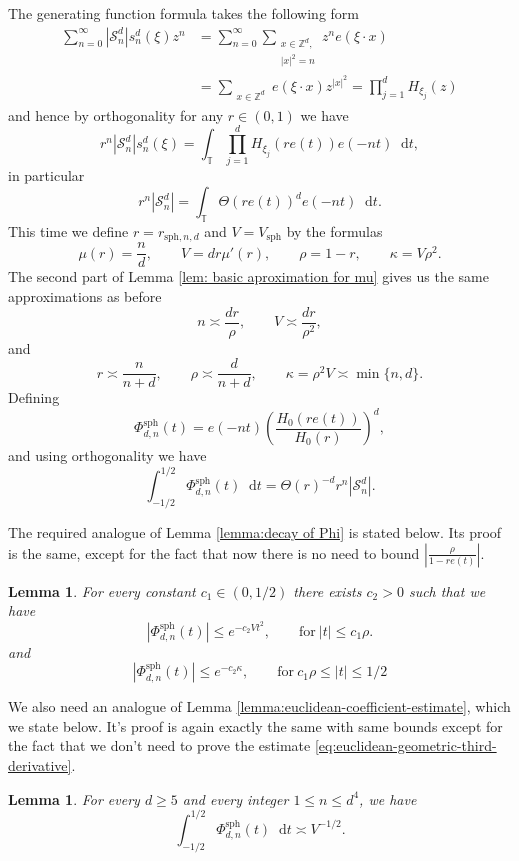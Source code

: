 \documentclass{article}
\newcommand{\Z}{\mathbb Z}
\newcommand{\T}{\mathbb T}
\newcommand{\dd}{\mathop{}\!\mathrm{d}}
\theoremstyle{plain}
\newtheorem{lemma}[theorem]{Lemma}
\numberwithin{equation}{section}
\begin{document}
The generating function formula takes the following form
\begin{align*}
    \sum_{n=0}^\infty |\mathcal{S}_n^{d}| s_n^d(\xi) z^n&= \sum_{n=0}^\infty \sum_{\substack{x \in \Z^d,\\|x|^2 = n}}  z^n e(\xi \cdot x)\\ 
    &=  \sum_{\substack{x \in \Z^d}} e(\xi \cdot x) z^{|x|^2} =\prod_{j=1}^d H_{\xi_j}(z)
\end{align*}
and hence by orthogonality for any $r \in (0,1)$ we have 
\begin{equation*} 
   r^n |\mathcal{S}_n^{d}| s_n^d(\xi)= \int_\T \prod_{j=1}^d H_{\xi_j}(re(t)) e(-nt) \dd t,
\end{equation*}
in particular 
\begin{equation*}
   r^n |\mathcal{S}_n^{d}| = \int_\T \Theta(re(t))^d e(-nt) \dd t .
\end{equation*}
This time we define $r=r_{{\textrm{sph}},n,d}$ and $V=V_{{\textrm{sph}}}$ by the formulas
\[
\mu(r)= \frac{n}{d}, \qquad V=d r \mu'(r), \qquad \rho=1-r, \qquad \kappa=V \rho^2. 
\]
The second part of Lemma \ref{lem: basic aproximation for mu} gives us the same approximations as before
 \[
n \asymp \frac{dr}{\rho}, \qquad V \asymp \frac{dr}{\rho^2},
 \]
and
 \begin{equation*} 
     r \asymp \frac{n}{n+d}, \qquad \rho \asymp \frac{d}{n+d}, \qquad \kappa=\rho^2 V \asymp \min\{n,d \}.
 \end{equation*}
Defining
\begin{equation*}
\Phi^{\textrm{sph}}_{d,n}(t)
 =e(-nt)
 \left(\frac{H_0(re(t))}{H_0(r)}\right)^d,
\end{equation*}
and using orthogonality we have
\[
\int_{-1/2}^{1/2} \Phi^{\textrm{sph}}_{d,n}(t) \dd t =\Theta(r)^{-d} r^n |\mathcal{S}_n^d|.
\]

The required analogue of Lemma \ref{lemma:decay of Phi} is stated below. Its proof is the same, except for the fact that now there is no need to bound $|\frac{\rho}{1-re(t)}|$.
\begin{lemma} \label{lemma:decay of spher Phi}
For every constant $c_1 \in (0,1/2)$ there exists $c_2>0$ such that we have  
\begin{equation*}
 |\Phi^{\textrm{sph}}_{d,n}(t)|\leq e^{-c_2Vt^2},
 \qquad \text{for} \ |t|\leq c_1\rho.
\end{equation*}
and
\begin{equation*}
 |\Phi^{\textrm{sph}}_{d,n}(t)|\leq e^{-c_2\kappa}, \qquad \text{for} \ c_1 \rho \le |t| \le 1/2
\end{equation*}
\end{lemma}
We also need an analogue of Lemma \ref{lemma:euclidean-coefficient-estimate}, which we state below. It's proof is again exactly the same with same bounds except for the fact that we don't need to prove the estimate \eqref{eq:euclidean-geometric-third-derivative}.
\begin{lemma}
  For every $d\geq5$ and every integer $1\leq n\leq d^4$, we have
    \[
    \int_{-1/2}^{1/2} \Phi^{\textrm{sph}}_{d,n}(t) \dd t  \asymp V^{-1/2}.
    \]
\end{lemma}
\end{document}

